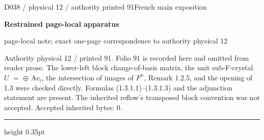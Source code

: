 \documentclass[9pt]{article}
\newcommand{\CanonText}[1]{\par{\fontsize{8.0}{9.35}\selectfont\RaggedRight #1\par}\vspace{2.2pt}}
\newcommand{\LayerTitle}{Restrained page-local apparatus}
\begin{document}
\noindent\begin{minipage}[t][\dimexpr\textheight-5pt\relax][t]{\textwidth}
{\sffamily\fontsize{7.3}{8.2}\selectfont\color{Quiet} D038 / physical 12 / authority printed 91\hfill French main exposition}
\par{}\vspace{4.5pt}
{\sffamily\fontsize{10.4}{11.6}\selectfont\bfseries\color{Accent} \LayerTitle}
\par{\sffamily\fontsize{6.7}{7.7}\selectfont\color{Quiet} page-local note; exact one-page correspondence to authority physical 12}
\vspace{5pt}
\CanonText{Authority physical 12 / printed 91. Folio 91 is recorded here and omitted from reader prose. The lower-left block change-of-basis matrix, the unit sub-F-crystal \(U\) \(=\) \(\oplus{}\) \(\text{Ae}_{i}\), the intersection of images of \(F^{n}\), Remark 1.2.5, and the opening of 1.3 were checked directly. Formulas (1.3.1.1)–(1.3.1.3) and the adjunction statement are present. The inherited reflow’s transposed block convention was not accepted. Accepted inherited bytes: 0.}
\vfill
{\color{Accent}\hrule height 0.35pt}\vspace{3pt}
\end{minipage}
\newpage
\end{document}

